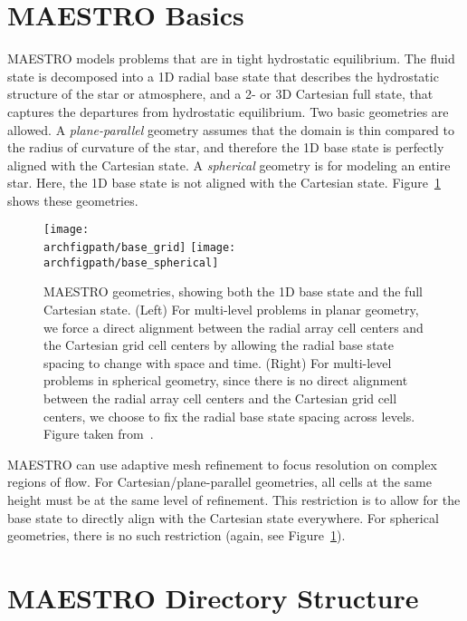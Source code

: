 \section{MAESTRO Basics}

MAESTRO models problems that are in tight hydrostatic equilibrium.
The fluid state is decomposed into a 1D radial base state that
describes the hydrostatic structure of the star or atmosphere, and a
2- or 3D Cartesian full state, that captures the departures from
hydrostatic equilibrium.  Two basic geometries are allowed.  A {\em
  plane-parallel} geometry assumes that the domain is thin compared to
the radius of curvature of the star, and therefore the 1D base state
is perfectly aligned with the Cartesian state.  A {\em spherical}
geometry is for modeling an entire star.  Here, the 1D base state is
not aligned with the Cartesian state.  Figure~\ref{fig:base_state}
shows these geometries.

\begin{figure}[tb]
\centering
\texttt{[image: \\archfigpath/base\_grid]} \hspace{0.5in}
\texttt{[image: \\archfigpath/base\_spherical]}
\caption[MAESTRO geometries]{\label{fig:base_state} MAESTRO geometries, showing both the
  1D base state and the full Cartesian state.  (Left) For multi-level
  problems in planar geometry, we force a direct alignment between the
  radial array cell centers and the Cartesian grid cell centers by
  allowing the radial base state spacing to change with space and
  time.  (Right) For multi-level problems in spherical geometry, since
  there is no direct alignment between the radial array cell centers
  and the Cartesian grid cell centers, we choose to fix the radial
  base state spacing across levels. Figure taken
  from~\cite{multilevel}.}
\end{figure}


MAESTRO can use adaptive mesh refinement to focus resolution on
complex regions of flow.  For Cartesian/plane-parallel geometries, all
cells at the same height must be at the same level of refinement.
This restriction is to allow for the base state to directly align with
the Cartesian state everywhere.  For spherical geometries, there is no
such restriction (again, see Figure~\ref{fig:base_state}).




\section{MAESTRO Directory Structure}

